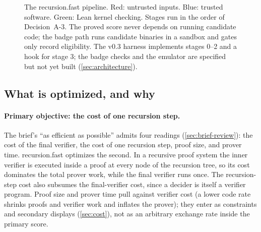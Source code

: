 \begin{figure}[!b]
\caption{The recursion.fast pipeline. Red: untrusted inputs. Blue: trusted software. Green: Lean
kernel checking. Stages run in the order of Decision~A-3. The proved score never depends on running
candidate code; the badge path runs candidate binaries in a sandbox and gates only record
eligibility. The v0.3 harness implements stages 0--2 and a hook for stage 3; the badge checks and
the emulator are specified but not yet built (\cref{sec:architecture}).}
\label{fig:obj-pipeline}
\end{figure}

\subsection{What is optimized, and why}\label{subsec:obj-what}

\paragraph{Primary objective: the cost of one recursion step.} The brief's \enquote{as efficient as
possible} admits four readings (\cref{sec:brief-review}): the cost of the final verifier, the cost
of one recursion step, proof size, and prover time. recursion.fast optimizes the second. In a
recursive proof system the inner verifier is executed inside a proof at every node of the
recursion tree, so its cost dominates the total prover work, while the final verifier runs once.
The recursion-step cost also subsumes the final-verifier cost, since a decider is itself a
verifier program. Proof size and prover time pull against verifier cost (a lower code rate shrinks
proofs and verifier work and inflates the prover); they enter as constraints and secondary
displays (\cref{sec:cost}), not as an arbitrary exchange rate inside the primary score.

